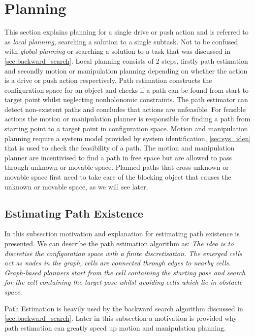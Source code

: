 \section{Planning}%
\label{sec:planning}
This section explains planning for a single drive or push action and is referred to as \textit{local planning}, searching a solution to a single subtask. Not to be confused with \textit{global planning} or searching a solution to a task that was discussed in \cref{sec:backward_search}. Local planning consists of 2 steps, firstly path estimation and secondly motion or manipulation planning depending on whether the action is a drive or push action respectively. Path estimation constructs the configuration space for an object and checks if a path can be found from start to target point whilst neglecting nonholonomic constraints. The path estimator can detect non-existent paths and concludes that actions are unfeasible. For feasible actions the motion or manipulation planner is responsible for finding a path from starting point to a target point in configuration space. Motion and manipulation planning require a system model provided by system identification, \cref{sec:sys_iden} that is used to check the feasibility of a path. The motion and manipulation planner are incentivised to find a path in free space but are allowed to pass through unknown or movable space. Planned paths that cross unknown or movable space first need to take care of the blocking object that causes the unknown or movable space, as we will see later.\bs

\subsection{Estimating Path Existence}%
\label{subsec:path_estimation}
In this subsection motivation and explanation for estimating path existence is presented. We can describe the path estimation algorithm as: \textit{The idea is to discretise the configuration space with a finite discretisation. The emerged cells act as nodes in the graph, cells are connected through edges to nearby cells. Graph-based planners start from the cell containing the starting pose and search for the cell containing the target pose whilst avoiding cells which lie in obstacle space.\bs}

Path Estimation is heavily used by the backward search algorithm discussed in \cref{sec:backward_search}. Later in this subsection a motivation is provided why path estimation can greatly speed up motion and manipulation planning.

